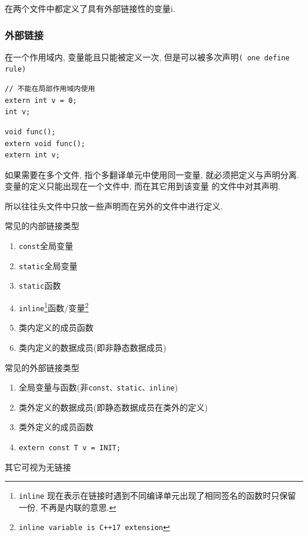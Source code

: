 

在两个文件中都定义了具有外部链接性的变量i.

\subsubsection{外部链接}
在一个作用域内, 变量能且只能被定义一次, 但是可以被多次声明{\tt( one define rule)}
\begin{paracol}{2}
	\begin{leftcolumn}
		\begin{lstlisting}[title=定义,xleftmargin=2em,xrightmargin=2em]
// 不能在局部作用域内使用
extern int v = 0; 
int v;
		\end{lstlisting}
	\end{leftcolumn}
	\begin{rightcolumn}
		\begin{lstlisting}[title=声明,xleftmargin=2em,xrightmargin=2em]
void func();
extern void func();
extern int v;
		\end{lstlisting}
	\end{rightcolumn}
\end{paracol}

如果需要在多个文件, 指个多翻译单元中使用同一变量, 就必须把定义与声明分离. 变量的定义只能出现在一个文件中, 而在其它用到该变量
	的文件中对其声明.

所以往往头文件中只放一些声明而在另外的文件中进行定义.

\begin{paracol}{2}
	\begin{leftcolumn}
		常见的内部链接类型
		\begin{enumerate}
			\item {\tt const}全局变量
			\item {\tt static}全局变量
			\item {\tt static}函数
			\item {\tt inline}\footnote[1]{{\tt inline} 现在表示在链接时遇到不同编译单元出现了相同签名的函数时只保留一份, 不再是内联的意思.}函数/变量\footnote[2]{{\tt inline variable is C++17 extension}}
			\item 类内定义的成员函数
			\item 类内定义的数据成员(即非静态数据成员)
		\end{enumerate}
	\end{leftcolumn}
	\begin{rightcolumn}
		常见的外部链接类型
		\begin{enumerate}
			\item 全局变量与函数(非{\tt const、static、inline})
			\item 类外定义的数据成员(即静态数据成员在类外的定义)
			\item 类外定义的成员函数
			\item {\tt extern const T v = INIT;}
		\end{enumerate}
	\end{rightcolumn}
\end{paracol}
其它可视为无链接

